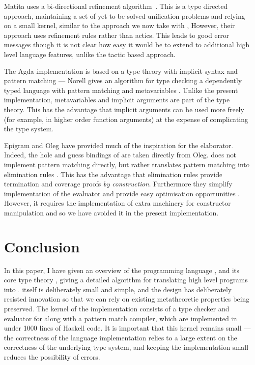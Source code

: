 Matita uses a bi-directional refinement algorithm~\cite{Asperti}. This is a
type directed approach, maintaining a set of yet to be solved unification
problems and relying on a small kernel, similar to the approach we now take
with \Idris{}, However, their approach uses refinement rules rather than
actics. This leads to good error messages though it is not clear how
easy it would be to extend to additional high level language features, unlike
the tactic based approach.

The Agda implementation is based on a type theory with
implicit syntax and pattern matching --- Norell gives an algorithm for type checking
a dependently typed language with pattern matching and metavariables 
\cite{norell2007thesis}. Unlike the present \Idris{} implementation, metavariables
and implicit arguments are part of the type theory. This has the advantage that
implicit arguments can be used more freely (for example, in higher order
function arguments) at the expense of complicating the type system.

Epigram \cite{McBride2004a} and Oleg \cite{McBride1999} 
have provided much of the inspiration for the \Idris{} elaborator. Indeed,
the hole and guess bindings of \TTdev{} are taken directly from Oleg.
\Epigram{} does not implement pattern matching directly, but rather translates
pattern matching into elimination rules \cite{McBride2002}. This has the
advantage that
elimination rules provide termination and coverage proofs \emph{by construction}.
Furthermore they simplify implementation of the evaluator and provide easy
optimisation opportunities \cite{Brady2003}. However, it requires the
implementation of extra machinery for constructor manipulation
\cite{McBride2006} and so we have avoided it in the present implementation.




\section{Conclusion}

\label{sect:conclusion}

In this paper, I have given an overview of the programming language \Idris{},
and its core type theory \TT{}, giving a detailed algorithm for translating
high level programs into \TT{}.
\TT{} itself is deliberately small and simple, and the design has deliberately
resisted innovation so that we can rely on existing metatheoretic properties
being preserved. The kernel of the \Idris{} implementation consists of a type checker
and evaluator for \TT{} along with a pattern match compiler, which are implemented
in under 1000 lines of Haskell code. It is important that this kernel remains small
--- the correctness of the language implementation relies to a large extent on
the correctness of the underlying type system, and keeping the implementation small
reduces the possibility of errors.

